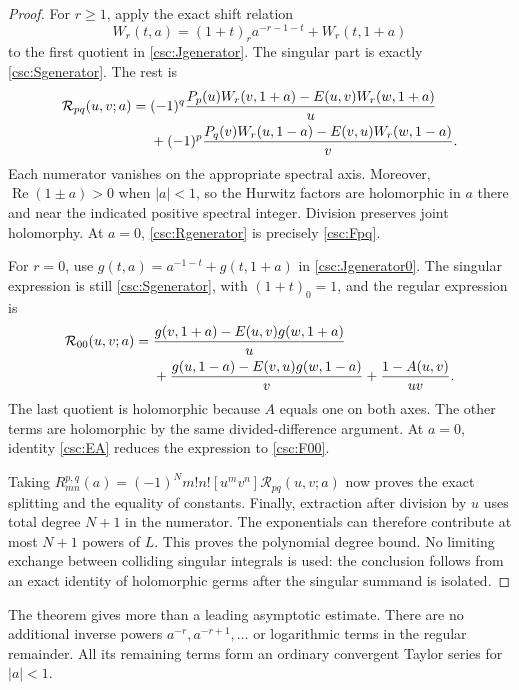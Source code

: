 \documentclass[11pt,a4paper]{article}
\numberwithin{equation}{section}
\theoremstyle{definition}
\newcommand{\Rea}{\operatorname{Re}}
\begin{document}
\begin{proof}
For $r\ge1$, apply the exact shift relation
\[
W_r(t,a)=(1+t)_r a^{-r-1-t}+W_r(t,1+a)
\]
to the first quotient in \eqref{csc:Jgenerator}. The singular part is exactly \eqref{csc:Sgenerator}. The rest is
\begin{align}
\mathcal R_{pq}(u,v;a)={}&(-1)^q
\frac{P_p(u)W_r(v,1+a)-E(u,v)W_r(w,1+a)}u\notag\\
&+(-1)^p
\frac{P_q(v)W_r(u,1-a)-E(v,u)W_r(w,1-a)}v.\label{csc:Rgenerator}
\end{align}
Each numerator vanishes on the appropriate spectral axis. Moreover, $\Rea(1\pm a)>0$ when $|a|<1$, so the Hurwitz factors are holomorphic in $a$ there and near the indicated positive spectral integer. Division preserves joint holomorphy. At $a=0$, \eqref{csc:Rgenerator} is precisely \eqref{csc:Fpq}.

For $r=0$, use $g(t,a)=a^{-1-t}+g(t,1+a)$ in \eqref{csc:Jgenerator0}. The singular expression is still \eqref{csc:Sgenerator}, with $(1+t)_0=1$, and the regular expression is
\begin{align}
\mathcal R_{00}(u,v;a)={}&
\frac{g(v,1+a)-E(u,v)g(w,1+a)}u\notag\\
&+\frac{g(u,1-a)-E(v,u)g(w,1-a)}v
+\frac{1-A(u,v)}{uv}.\label{csc:Rgenerator0}
\end{align}
The last quotient is holomorphic because $A$ equals one on both axes. The other terms are holomorphic by the same divided-difference argument. At $a=0$, identity \eqref{csc:EA} reduces the expression to \eqref{csc:F00}.

Taking $R_{mn}^{p,q}(a)=(-1)^Nm!n![u^mv^n]\mathcal R_{pq}(u,v;a)$ now proves the exact splitting and the equality of constants. Finally, extraction after division by $u$ uses total degree $N+1$ in the numerator. The exponentials can therefore contribute at most $N+1$ powers of $L$. This proves the polynomial degree bound. No limiting exchange between colliding singular integrals is used: the conclusion follows from an exact identity of holomorphic germs after the singular summand is isolated.
\end{proof}
The theorem gives more than a leading asymptotic estimate. There are no additional inverse powers $a^{-r},a^{-r+1},\ldots$ or logarithmic terms in the regular remainder. All its remaining terms form an ordinary convergent Taylor series for $|a|<1$.
\end{document}
